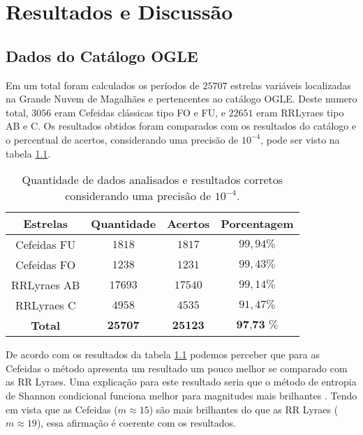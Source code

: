\chapter{Resultados e Discussão}
\label{cap:resultados}

\section{Dados do Catálogo OGLE}

Em um total foram calculados os períodos de $25707$ estrelas variáveis localizadas na Grande Nuvem de Magalhães e pertencentes ao catálogo OGLE. Deste numero total, $3056$ eram Cefeidas clássicas tipo FO e FU, e $22651$ eram RRLyraes tipo AB e C. Os resultados obtidos foram comparados com os resultados do catálogo e o percentual de acertos, considerando uma precisão de $10^{-4}$, pode ser visto na tabela \ref{tab:resultados}.

\begin{table}
\begin{center}
\caption[Quantidade de dados analisados e resultados corretos.]{Quantidade de dados analisados e resultados corretos considerando uma precisão de $10^{-4}$.}
\begin{tabular}{c|c|c|c}
\toprule
Estrelas & Quantidade & Acertos  & Porcentagem \\
\midrule
Cefeidas FU & $1818$ & $1817$ & $99,94 \%$ \\
Cefeidas FO & $1238$ & $1231$ & $99,43 \%$ \\
RRLyraes AB& $17693$ & $17540$ & $99,14 \%$ \\
RRLyraes C& $4958$ & $4535$ & $91,47 \%$ \\
\midrule
\textbf{Total} & $\textbf{25707}$ & $\textbf{25123}$ & $\textbf{97,73 \%}$ \\
\bottomrule
\end{tabular}
\label{tab:resultados}
\end{center}
\end{table}

De acordo com os resultados da tabela \ref{tab:resultados} podemos perceber que para as Cefeidas o método apresenta um resultado um pouco melhor se comparado com as RR Lyraes. Uma explicação para este resultado seria que o método de entropia de Shannon condicional funciona melhor para magnitudes mais brilhantes \citep{comparison}. Tendo em vista que as Cefeidas ($m \approx 15$) são mais brilhantes do que as RR Lyraes ($m \approx 19$), essa afirmação é coerente com os resultados. %

